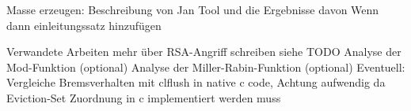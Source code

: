 Masse erzeugen:
Beschreibung von Jan Tool und die Ergebnisse davon
Wenn dann einleitungssatz hinzufügen

Verwandete Arbeiten mehr über RSA-Angriff schreiben siehe TODO
Analyse der Mod-Funktion (optional)
Analyse der Miller-Rabin-Funktion (optional)
Eventuell: Vergleiche Bremsverhalten mit clflush in native c code,
Achtung aufwendig da Eviction-Set Zuordnung in c implementiert werden muss



